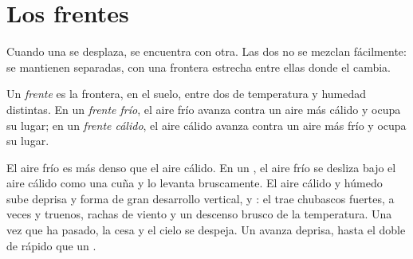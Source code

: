\section{Los frentes}

Cuando una  se desplaza, se encuentra con otra. Las dos no se
mezclan fácilmente: se mantienen separadas, con una frontera estrecha entre
ellas donde el  cambia.

\begin{definition}[Frente]\label{def:g8:fronts-and-weather-maps:front}
Un \emph{frente} es la frontera, en el suelo, entre dos  de temperatura y humedad distintas. En un
\emph{frente frío}, el aire frío avanza
contra un aire más cálido y ocupa su lugar; en un
\emph{frente cálido}, el aire cálido
avanza contra un aire más frío y ocupa su lugar.
\end{definition}

El aire frío es más denso que el aire cálido. En un , el aire
frío se desliza bajo el aire cálido como una cuña y lo levanta
bruscamente. El aire cálido y húmedo sube deprisa y forma  de gran
desarrollo vertical,  y : el  trae chubascos
fuertes, a veces  y truenos, rachas de viento y un descenso brusco
de la temperatura. Una vez que ha pasado, la  cesa y el cielo se
despeja. Un  avanza deprisa, hasta el doble de rápido que un
.

